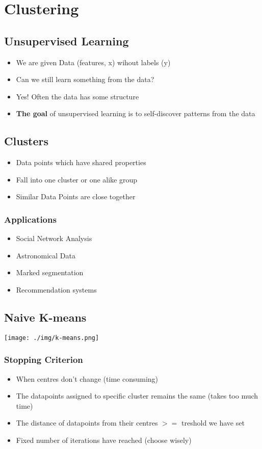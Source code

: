 \section{Clustering}
\subsection{Unsupervised Learning}
\begin{itemize}
    \item We are given Data (features, x) wihout labels (y)
    \item Can we still learn something from the data?
    \item Yes! Often the data has some structure
    \item \textbf{The goal} of unsupervised learning is to self-discover patterns from the data
\end{itemize}

\subsection{Clusters}
\begin{itemize}
    \item Data points which have shared properties
    \item Fall into one cluster or one alike group
    \item Similar Data Points are close together
\end{itemize}
\subsubsection{Applications}
\begin{itemize}
    \item Social Network Analysis
    \item Astronomical Data
    \item Marked segmentation
    \item Recommendation systems
\end{itemize}
\subsection{Naive K-means}
\texttt{[image: ./img/k-means.png]}

\subsubsection{Stopping Criterion}
\begin{itemize}
    \item When centres don't change (time consuming)
    \item The datapoints assigned to specific cluster remains the same (takes too much time)
    \item The distance of datapoints from their centres $>=$ treshold we have set
    \item Fixed number of iterations have reached (choose wisely)
\end{itemize}

